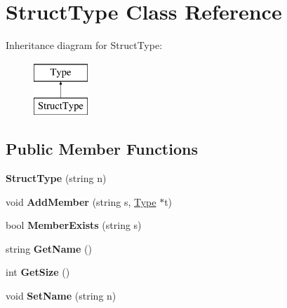 \hypertarget{classStructType}{\section{Struct\-Type Class Reference}
\label{classStructType}
}
Inheritance diagram for Struct\-Type\-:\begin{figure}[H]
\begin{center}
\leavevmode
\includegraphics[height=2.000000cm]{classStructType}
\end{center}
\end{figure}
\subsection*{Public Member Functions}
\begin{DoxyCompactItemize}
\item 
\hypertarget{classStructType_aafa771ab1d48b12833e9e489506fbc3c}{{\bfseries Struct\-Type} (string n)}\label{classStructType_aafa771ab1d48b12833e9e489506fbc3c}

\item 
\hypertarget{classStructType_a95489a8cd278d6e4f98c0baef687e848}{void {\bfseries Add\-Member} (string s, \hyperlink{classType}{Type} $\ast$t)}\label{classStructType_a95489a8cd278d6e4f98c0baef687e848}

\item 
\hypertarget{classStructType_a00677122f91008ee4f6161ba96eca2b2}{bool {\bfseries Member\-Exists} (string s)}\label{classStructType_a00677122f91008ee4f6161ba96eca2b2}

\item 
\hypertarget{classType_a8143fe4686ae1a5709a5955396c6ee26}{string {\bfseries Get\-Name} ()}\label{classType_a8143fe4686ae1a5709a5955396c6ee26}

\item 
\hypertarget{classType_afe0fca035825759785b525d2a24f69fe}{int {\bfseries Get\-Size} ()}\label{classType_afe0fca035825759785b525d2a24f69fe}

\item 
\hypertarget{classType_ab8d2328a3a76289edf42b9bf0d4f278f}{void {\bfseries Set\-Name} (string n)}\label{classType_ab8d2328a3a76289edf42b9bf0d4f278f}

\end{DoxyCompactItemize}

